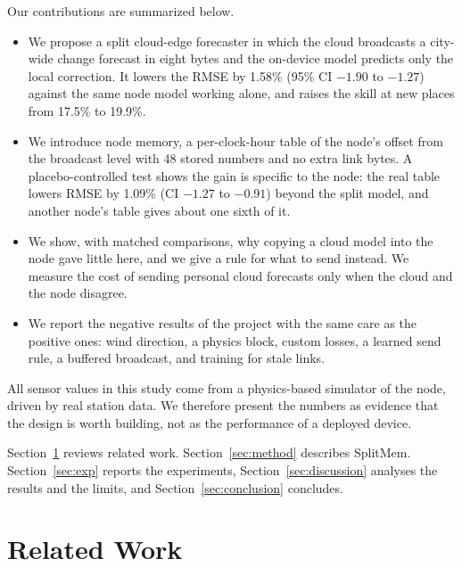 \documentclass[journal]{IEEEtran}
\begin{document}
Our contributions are summarized below.
\begin{itemize}
\item We propose a split cloud-edge forecaster in which the cloud broadcasts a city-wide change forecast in eight bytes and the on-device model predicts only the local correction. It lowers the RMSE by 1.58\% (95\% CI $-1.90$ to $-1.27$) against the same node model working alone, and raises the skill at new places from 17.5\% to 19.9\%.
\item We introduce node memory, a per-clock-hour table of the node's offset from the broadcast level with 48 stored numbers and no extra link bytes. A placebo-controlled test shows the gain is specific to the node: the real table lowers RMSE by 1.09\% (CI $-1.27$ to $-0.91$) beyond the split model, and another node's table gives about one sixth of it.
\item We show, with matched comparisons, why copying a cloud model into the node gave little here, and we give a rule for what to send instead. We measure the cost of sending personal cloud forecasts only when the cloud and the node disagree.
\item We report the negative results of the project with the same care as the positive ones: wind direction, a physics block, custom losses, a learned send rule, a buffered broadcast, and training for stale links.
\end{itemize}

All sensor values in this study come from a physics-based simulator of the node, driven by real station data. We therefore present the numbers as evidence that the design is worth building, not as the performance of a deployed device.

Section~\ref{sec:related} reviews related work. Section~\ref{sec:method} describes SplitMem. Section~\ref{sec:exp} reports the experiments, Section~\ref{sec:discussion} analyses the results and the limits, and Section~\ref{sec:conclusion} concludes.

\section{Related Work}
\label{sec:related}
\end{document}
